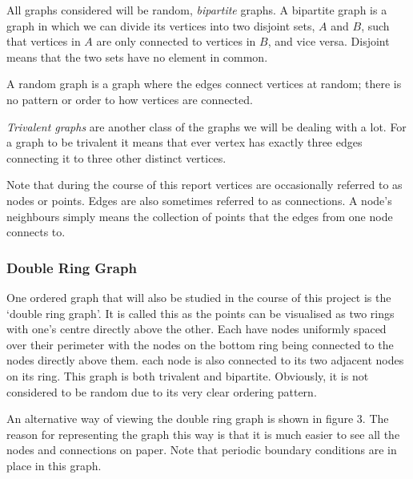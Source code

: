 \documentclass[pdftex,12pt,a4paper]{article}
\begin{document}
All graphs considered will be random, \emph{bipartite} graphs. A bipartite graph is a graph in which we can divide its vertices into two disjoint sets, $A$ and $B$, such that vertices in $A$ are only connected to vertices in $B$, and vice versa. Disjoint means that the two sets have no element in common.

A random graph is a graph where the edges connect vertices at random; there is no pattern or order to how vertices are connected.

\emph{Trivalent graphs} are another class of the graphs we will be dealing with a lot. For a graph to be trivalent it means that ever vertex has exactly three edges connecting it to three other distinct vertices.

Note that during the course of this report vertices are occasionally referred to as nodes or points. Edges are also sometimes referred to as connections. A node's neighbours simply means the collection of points that the edges from one node connects to.





\subsubsection{Double Ring Graph}

One ordered graph that will also be studied in the course of this project is the `double ring graph'. It is called this as the points can be visualised as two rings with one's centre directly above the other. Each have nodes uniformly spaced over their perimeter with the nodes on the bottom ring being connected to the nodes directly above them. each node is also connected to its two adjacent nodes on its ring. This graph is both trivalent and bipartite. Obviously, it is not considered to be random due to its very clear ordering pattern.

An alternative way of viewing the double ring graph is shown in figure 3. The reason for representing the graph this way is that it is much easier to see all the nodes and connections on paper. Note that periodic boundary conditions are in place in this graph.

\end{document}

